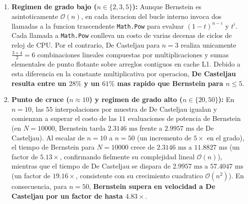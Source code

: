 \begin{enumerate}
    \item \textbf{Regimen de grado bajo ($n \in \{2, 3, 5\}$):} Aunque Bernstein es asintoticamente $\mathcal{O}(n)$, en cada iteracion del bucle interno invoca dos llamadas a la funcion trascendente \texttt{Math.Pow} para evaluar $(1-t)^{n-i}$ y $t^i$. Cada llamada a \texttt{Math.Pow} conlleva un costo de varias decenas de ciclos de reloj de CPU. Por el contrario, De Casteljau para $n = 3$ realiza unicamente $\frac{3 \times 4}{2} = 6$ combinaciones lineales compuestas por multiplicaciones y sumas elementales de punto flotante sobre arreglos contiguos en cache L1. Debido a esta diferencia en la constante multiplicativa por operacion, \textbf{De Casteljau resulta entre un $28\%$ y un $61\%$ mas rapido que Bernstein para $n \le 5$}.
    \item \textbf{Punto de cruce ($n \approx 10$) y regimen de grado alto ($n \in \{20, 50\}$):} En $n = 10$, las $55$ interpolaciones por muestra de De Casteljau igualan y comienzan a superar el costo de las $11$ evaluaciones de potencia de Bernstein (en $N = 10000$, Bernstein tarda $2.3146\text{ ms}$ frente a $2.9957\text{ ms}$ de De Casteljau). Al escalar de $n = 10$ a $n = 50$ (un incremento de $5\times$ en el grado), el tiempo de Bernstein para $N = 10000$ crece de $2.3146\text{ ms}$ a $11.8827\text{ ms}$ (un factor de $5.13\times$, confirmando fielmente su complejidad lineal $\mathcal{O}(n)$), mientras que el tiempo de De Casteljau se dispara de $2.9957\text{ ms}$ a $57.4047\text{ ms}$ (un factor de $19.16\times$, consistente con su crecimiento cuadratico $\mathcal{O}(n^2)$). En consecuencia, para $n = 50$, \textbf{Bernstein supera en velocidad a De Casteljau por un factor de hasta $4.83\times$}.
\end{enumerate}

